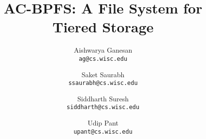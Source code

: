 \title{
     AC-BPFS: A File System for Tiered Storage
    }

\linespread{1.2}

\author{
Aishwarya Ganesan\\
\texttt{ag@cs.wisc.edu}
\and
Saket Saurabh\\
\texttt{ssaurabh@cs.wisc.edu}
\and
Siddharth Suresh\\
\texttt{siddharth@cs.wisc.edu}
\and
Udip Pant\\
\texttt{upant@cs.wisc.edu}
}

\date{\vspace{-0.2in}}
\maketitle
